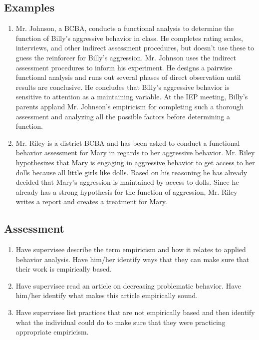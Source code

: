 \subsection{Examples}
\begin{enumerate}
\item Mr. Johnson, a BCBA, conducts a functional analysis to determine the function of Billy's aggressive behavior in class. He completes rating scales, interviews, and other indirect assessment procedures, but doesn't use these to guess the reinforcer for Billy's aggression. Mr. Johnson uses the indirect assessment procedures to inform his experiment. He designs a pairwise functional analysis and runs out several phases of direct observation until results are conclusive. He concludes that Billy's aggressive behavior is sensitive to attention as a maintaining variable. At the IEP meeting, Billy's parents applaud Mr. Johnson's empiricism for completing such a thorough assessment and analyzing all the possible factors before determining a function. 
\item Mr. Riley is a district BCBA and has been asked to conduct a functional behavior assessment for Mary in regards to her aggressive behavior. Mr. Riley hypothesizes that Mary is engaging in aggressive behavior to get access to her dolls because all little girls like dolls. Based on his reasoning he has already decided that Mary's aggression is maintained by access to dolls. Since he already has a strong hypothesis for the function of aggression, Mr. Riley writes a report and creates a treatment for Mary.

\end{enumerate}
%
\subsection{Assessment}
\begin{enumerate}
\item Have supervisee describe the term empiricism and how it relates to applied behavior analysis. Have him/her identify ways that they can make sure that their work is empirically based. 
\item Have supervisee read an article on decreasing problematic behavior. Have him/her identify what makes this article empirically sound. 
\item Have supervisee list practices that are not empirically based and then identify what the individual could do to make sure that they were practicing appropriate empiricism. 
\end{enumerate}
%
